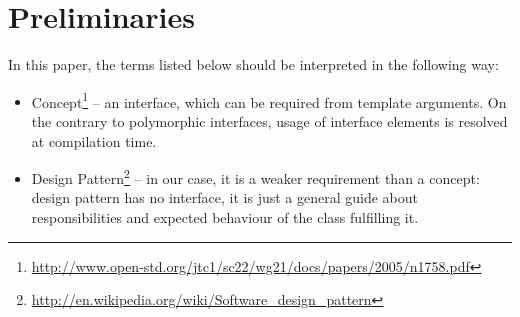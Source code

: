 \documentclass[licencjacka]{pracamgr}
\begin{document}
\setcounter{chapter}{-1}

\chapter{Preliminaries}
In this paper, the terms listed below should be interpreted in the following way:
\begin{itemize}
\item Concept\footnote{\url{http://www.open-std.org/jtc1/sc22/wg21/docs/papers/2005/n1758.pdf}}
	-- an interface, which can be required from template arguments.
	On the contrary to polymorphic interfaces, usage of interface elements is resolved at compilation time.
\item Design Pattern\footnote{\url{http://en.wikipedia.org/wiki/Software_design_pattern}}
	-- in our case, it is a weaker requirement than a concept: design pattern has no interface,
	it is just a general guide about responsibilities and expected behaviour of the class
	fulfilling it.
\end{itemize}








\appendix



\end{document}
